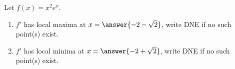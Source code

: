 \documentclass{ximera}
\author{Gregory Hartman \and Matthew Carr}
\begin{document}
\begin{exercise}






Let $f(x)=x^{2}e^{x}$.
\begin{enumerate}
\item		$f'$ has local maxima at $x=\answer{-2-\sqrt{2}}$, write DNE if no such point(s) exist.
\item		$f'$ has local minima at $x=\answer{-2+\sqrt{2}}$, write DNE if no such point(s) exist.
\end{enumerate}

\end{exercise}
\end{document}
